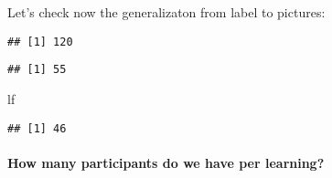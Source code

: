 \documentclass[
]{article}
\newenvironment{Shaded}{\begin{snugshade}}{\end{snugshade}}
\newcommand{\KeywordTok}[1]{\textcolor[rgb]{0.13,0.29,0.53}{\textbf{#1}}}
\newcommand{\NormalTok}[1]{#1}
\newcommand{\OperatorTok}[1]{\textcolor[rgb]{0.81,0.36,0.00}{\textbf{#1}}}
\newcommand{\StringTok}[1]{\textcolor[rgb]{0.31,0.60,0.02}{#1}}
\begin{document}
Let's check now the generalizaton from label to pictures:

\begin{Shaded}
\end{Shaded}

\begin{verbatim}
## [1] 120
\end{verbatim}

\begin{Shaded}
\end{Shaded}

\begin{verbatim}
## [1] 55
\end{verbatim}

\begin{Shaded}
\begin{Highlighting}[]
\NormalTok{lf}
\end{Highlighting}
\end{Shaded}

\begin{verbatim}
## [1] 46
\end{verbatim}

\hypertarget{how-many-participants-do-we-have-per-learning-1}{%
\paragraph{How many participants do we have per
learning?}\label{how-many-participants-do-we-have-per-learning-1}}
\end{document}
